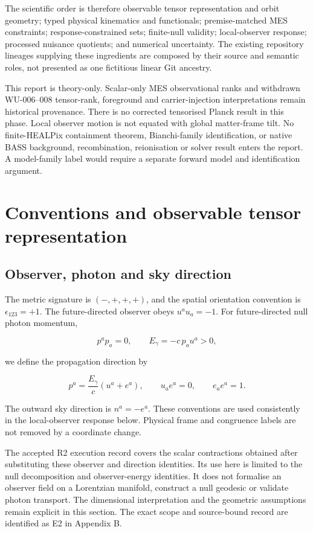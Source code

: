\documentclass[
  11pt,
  a4paper]{article}
\begin{document}
The scientific order is therefore observable tensor representation and orbit geometry; typed physical kinematics and functionals; premise-matched MES constraints; response-constrained sets; finite-null validity; local-observer response; processed nuisance quotients; and numerical uncertainty. The existing repository lineages supplying these ingredients are composed by their source and semantic roles, not presented as one fictitious linear Git ancestry.

This report is theory-only. Scalar-only MES observational ranks and withdrawn WU-006--008 tensor-rank, foreground and carrier-injection interpretations remain historical provenance. There is no corrected tensorised Planck result in this phase. Local observer motion is not equated with global matter-frame tilt. No finite-HEALPix containment theorem, Bianchi-family identification, or native BASS background, recombination, reionisation or solver result enters the report. A model-family label would require a separate forward model and identification argument.

\hypertarget{conventions-and-observable-tensor-representation}{%
\section{Conventions and observable tensor representation}\label{conventions-and-observable-tensor-representation}}

\hypertarget{observer-photon-and-sky-direction}{%
\subsection{Observer, photon and sky direction}\label{observer-photon-and-sky-direction}}

The metric signature is \((-,+,+,+)\), and the spatial orientation convention is \(\epsilon_{123}=+1\). The future-directed observer obeys \(u^a u_a=-1\). For future-directed null photon momentum,

\[
p^a p_a=0,
\qquad E_\gamma=-c\,p_a u^a>0,
\]

we define the propagation direction by

\[
p^a=\frac{E_\gamma}{c}(u^a+e^a),
\qquad u_a e^a=0,
\qquad e_a e^a=1.
\]

The outward sky direction is \(n^a=-e^a\). These conventions are used consistently in the local-observer response below. Physical frame and congruence labels are not removed by a coordinate change.

The accepted R2 execution record covers the scalar contractions obtained after substituting these observer and direction identities. Its use here is limited to the null decomposition and observer-energy identities. It does not formalise an observer field on a Lorentzian manifold, construct a null geodesic or validate photon transport. The dimensional interpretation and the geometric assumptions remain explicit in this section. The exact scope and source-bound record are identified as E2 in Appendix B.
\end{document}
